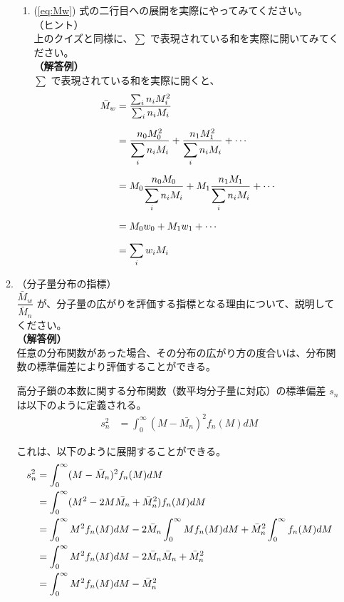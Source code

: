 \documentclass[a4paper,11pt]{ltjsarticle}
\begin{document}
\begin{itemize}
\begin{enumerate}
\begin{enumerate}
		\item
		(\ref{eq:Mw}) 式の二行目への展開を実際にやってみてください。\\
		（ヒント）\\
		上のクイズと同様に、$\sum$ で表現されている和を実際に開いてみてください。\\
		{\bf（解答例）}\\
		$\sum$ で表現されている和を実際に開くと、
		\begin{align*}
		{\bar M}_w 
			&= \dfrac{\sum_i n_i M_i^2}{\sum_i n_i M_i}\notag \\[6pt]
			&= \dfrac{n_0 M_0^2}{\displaystyle \sum_i n_i M_i} + \dfrac{n_1 M_1^2}{\displaystyle \sum_i n_i M_i} + \cdots \notag \\[6pt]
			&= M_0 \dfrac{n_0 M_0}{\displaystyle \sum_i n_i M_i} + M_1 \dfrac{n_1 M_1}{\displaystyle \sum_i n_i M_i} + \cdots \notag \\[6pt]
			&= M_0 w_0 + M_1 w_1 + \cdots \notag \\[6pt]
			&= \displaystyle \sum_i w_i M_i
		\end{align*}
		\end{enumerate}
	\item
	（分子量分布の指標）\\
	$\dfrac{\bar{M}_w}{\bar{M}_n}$ が、分子量の広がりを評価する指標となる理由について、説明してください。\\
	{\bf（解答例）}\\
	任意の分布関数があった場合、その分布の広がり方の度合いは、分布関数の標準偏差により評価することができる。

	高分子鎖の本数に関する分布関数（数平均分子量に対応）の標準偏差 $s_n$ は以下のように定義される。
	\begin{align}
	s_n^2
		&= \displaystyle \int_0^{\infty}(M - \bar{M_n})^2 f_n(M) dM
	\end{align}

	これは、以下のように展開することができる。
	\begin{align}
	s_n^2
		&= \displaystyle \int_0^{\infty}(M - \bar{M}_n)^2 f_n(M) dM \notag \\
		&= \displaystyle \int_0^{\infty}(M^2 - 2M \bar{M_n} + \bar{M}_n^2) f_n(M) dM \notag \\
		&= \displaystyle \int_0^{\infty} M^2 f_n(M) dM - 2 \bar{M}_n \displaystyle \int_0^{\infty} M f_n(M) dM + \bar{M}_n^2 \displaystyle \int_0^{\infty} 
			f_n(M) dM \notag \\
		&= \displaystyle \int_0^{\infty} M^2 f_n(M) dM - 2 \bar{M}_n \bar{M}_n + \bar{M}_n^2  \notag \\
		&= \displaystyle \int_0^{\infty} M^2 f_n(M) dM - \bar{M}_n^2
	\end{align}


\end{enumerate}
\end{itemize}
\end{document}
